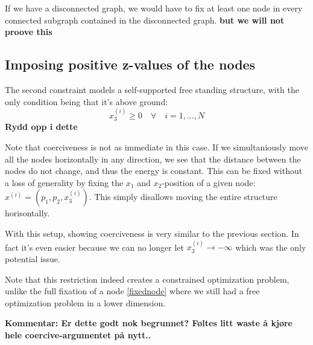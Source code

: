 If we have a disconnected graph, we would have to fix at least one node in every connected subgraph contained in the disconnected graph. \textbf{but we will not proove this}

\subsection{Imposing positive z-values of the nodes}
The second constraint models a self-supported free standing structure, with the only condition being that it's above ground:
\begin{equation}
    x_3^{(i)} \geq 0 \quad \forall \quad i = 1,...,N
\end{equation}
\textbf{Rydd opp i dette}

Note that coerciveness is not as immediate in this case. If we simultaniously move all the nodes horizontally in any direction, we see that the distance between the nodes do not change, and thus the energy is constant. This can be fixed without a loss of generality by fixing the $x_1$ and $x_2$-position of a given node: $x^{(i)} = (p_1,p_2,x^{(i)}_3)$. This simply disallows moving the entire structure horisontally.

With this setup, showing coerciveness is very similar to the previous section. In fact it's even easier because we can no longer let $x^{(i)}_3 \to -\infty$ which was the only potential issue.

Note that this restriction indeed creates a constrained optimization problem, unlike the full fixation of a node \eqref{fixednode} where we still had a free optimization problem in a lower dimension.

\textbf{Kommentar: Er dette godt nok begrunnet? Føltes litt waste å kjøre hele coercive-argumentet på nytt..}

